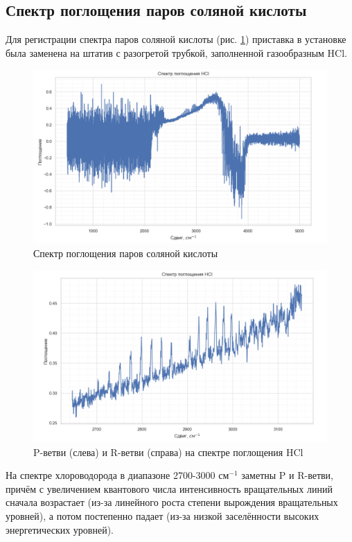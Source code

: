 \documentclass{article}
\begin{document}
\subsection{Спектр поглощения паров соляной кислоты}\;
\par Для регистрации спектра паров соляной кислоты (рис. \ref{HCl}) приставка в установке была заменена на штатив с разогретой трубкой, заполненной газообразным HCl. 
\begin{figure}[h!]
\centering
    \includegraphics[width=0.8\linewidth]{Images/HCl.png}
    \caption{Спектр поглощения паров соляной кислоты}
    \label{HCl}
\end{figure}
\begin{figure}[h!]
\centering
    \includegraphics[width=0.8\linewidth]{Images/ветви.png}
    \caption{P-ветви (слева) и R-ветви (справа) на спектре поглощения HCl}
    \label{ветви}
\end{figure}
\par На спектре хлороводорода в диапазоне 2700-3000 $см^{-1}$ заметны P и R-ветви, причём с увеличением квантового числа интенсивность вращательных линий сначала возрастает (из-за
линейного роста степени вырождения вращательных уровней), а потом постепенно падает (из-за низкой заселённости высоких энергетических уровней).
\newpage
\end{document}
